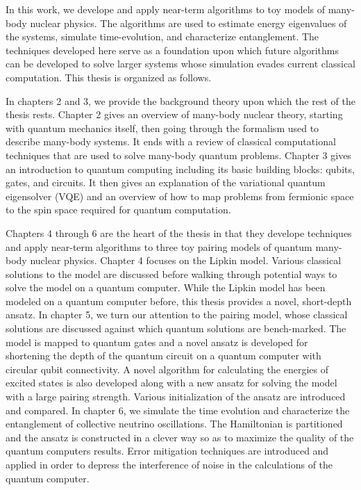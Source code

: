 \documentclass[10pt]{article}
\begin{document}
In this work, we develope and apply near-term algorithms to toy models of many-body nuclear physics. The algorithms are used to estimate energy eigenvalues of the systems, simulate time-evolution, and characterize entanglement. The techniques developed here serve as a foundation upon which future algorithms can be developed to solve larger systems whose simulation evades current classical computation. This thesis is organized as follows.

In chapters 2 and 3, we provide the background theory upon which the rest of the thesis rests. Chapter 2 gives an overview of many-body nuclear theory, starting with quantum mechanics itself, then going through the formalism used to describe many-body systems. It ends with a review of classical computational techniques that are used to solve many-body quantum problems. Chapter 3 gives an introduction to quantum computing including its basic building blocks: qubits, gates, and circuits. It then gives an explanation of the variational quantum eigensolver (VQE) and an overview of how to map problems from fermionic space to the spin space required for quantum computation.

Chapters 4 through 6 are the heart of the thesis in that they develope techniques and apply near-term algorithms to three toy pairing models of quantum many-body nuclear physics. Chapter 4 focuses on the Lipkin model. Various classical solutions to the model are discussed before walking through potential ways to solve the model on a quantum computer. While the Lipkin model has been modeled on a quantum computer before, this thesis provides a novel, short-depth ansatz. In chapter 5, we turn our attention to the pairing model, whose classical solutions are discussed against which quantum solutions are bench-marked. The model is mapped to quantum gates and a novel ansatz is developed for shortening the depth of the quantum circuit on a quantum computer with circular qubit connectivity. A novel algorithm for calculating the energies of excited states is also developed along with a new ansatz for solving the model with a large pairing strength. Various initialization of the ansatz are introduced and compared. In chapter 6, we simulate the time evolution and characterize the entanglement of collective neutrino oscillations. The Hamiltonian is partitioned and the ansatz is constructed in a clever way so as to maximize the quality of the quantum computers results. Error mitigation techniques are introduced and applied in order to depress the interference of noise in the calculations of the quantum computer.
\end{document}
